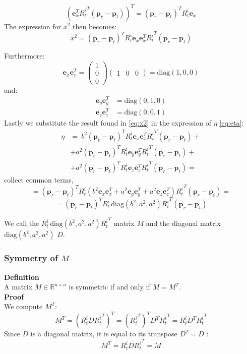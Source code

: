 \[
(\mathbf{e}_x^T {R_t^i}^T (\mathbf{p}_r - \mathbf{p}_t))^T = (\mathbf{p}_r - \mathbf{p}_t)^T {R_t^i} \mathbf{e}_x
\]
The expression for $x^2$ then becomes:
\begin{equation}
    x^2 = \left(\mathbf{p}_r - \mathbf{p}_t\right)^T {R_t^i} \mathbf{e}_x \mathbf{e}_x^T {R_t^i}^T \left(\mathbf{p}_r - \mathbf{p}_t\right)
    \label{eq:x2}
\end{equation}

Furthermore:
\[
\mathbf{e}_x \mathbf{e}_x^T =\begin{pmatrix}
1 \\
0 \\
0
\end{pmatrix}
\begin{pmatrix}
1 & 0 & 0
\end{pmatrix}
 = \text{diag}(1,0,0)
\]
and:
\[
\begin{aligned}
    \mathbf{e}_y \mathbf{e}_y^T &= \text{diag}(0,1,0) \\
    \mathbf{e}_z \mathbf{e}_z^T &= \text{diag}(0,0,1)
\end{aligned}
\]
Lastly we substitute the result found in \ref{eq:x2} in the expression of $\eta$ \ref{eq:eta}:
\[
\begin{aligned}
    \eta &=  \ b^2 \left(\mathbf{p}_r - \mathbf{p}_t\right)^T R_t^i \mathbf{e}_x \mathbf{e}_x^T {R_t^i}^T \left(\mathbf{p}_r - \mathbf{p}_t\right) + \\
    &+ a^2 \left(\mathbf{p}_r - \mathbf{p}_t\right)^T R_t^i \mathbf{e}_y \mathbf{e}_y^T {R_t^i}^T \left(\mathbf{p}_r - \mathbf{p}_t\right) +\\
    &+ a^2 \left(\mathbf{p}_r - \mathbf{p}_t\right)^T R_t^i \mathbf{e}_z \mathbf{e}_z^T {R_t^i}^T \left(\mathbf{p}_r - \mathbf{p}_t\right) =
\end{aligned}
\]
collect common terms,
\[
= \left(\mathbf{p}_r - \mathbf{p}_t\right)^T R_t^i \left( b^2 \mathbf{e}_x \mathbf{e}_x^T + a^2 \mathbf{e}_y \mathbf{e}_y^T + a^2 \mathbf{e}_z \mathbf{e}_z^T \right) {R_t^i}^T \left(\mathbf{p}_r - \mathbf{p}_t\right)=
\]
\begin{equation}
    = \left(\mathbf{p}_r - \mathbf{p}_t\right)^T R_t^i \, \text{diag}(b^2, a^2, a^2) {R_t^i}^T \left(\mathbf{p}_r - \mathbf{p}_t\right)
    \label{eq:eta2}
\end{equation}

We call the \( R_t^i \, \text{diag}(b^2, a^2, a^2) {R_t^i}^T \) matrix $M$ and the diagonal matrix $\text{diag}(b^2, a^2, a^2)$ $D$.

\subsubsection{Symmetry of \( M \)}
\textbf{Definition} \\
A matrix \( M \in \mathbb{R}^{n \times n} \) is symmetric if and only if \( M = M^T \).
\\
\textbf{Proof} \\
We compute \( M^T \):
\[
M^T = \left( R_t^i D {R_t^i}^T \right)^T = \left( {R_t^i}^T \right)^T D^T {R_t^i}^T = R_t^i D^T {R_t^i}^T
\]
Since \( D \) is a diagonal matrix, it is equal to its transpose $D^T = D$ :
$$
M^T =  R_t^i D {R_t^i}^T = M
$$


